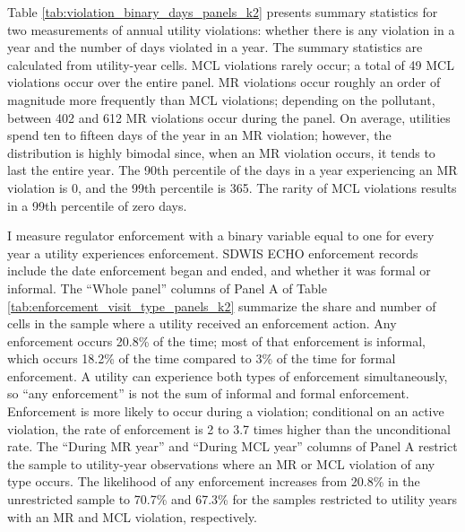 \documentclass[12pt]{article}
\begin{document}
Table \ref{tab:violation_binary_days_panels_k2} presents summary statistics for two measurements of annual utility violations: whether there is any violation in a year and the number of days violated in a year. The summary statistics are calculated from utility-year cells. MCL violations rarely occur; a total of 49 MCL violations occur over the entire panel. MR violations occur roughly an order of magnitude more frequently than MCL violations; depending on the pollutant, between 402 and 612 MR violations occur during the panel. On average, utilities spend ten to fifteen days of the year in an MR violation; however, the distribution is highly bimodal since, when an MR violation occurs, it tends to last the entire year. The 90th percentile of the days in a year experiencing an MR violation is 0, and the 99th percentile is 365. The rarity of MCL violations results in a 99th percentile of zero days.


I measure regulator enforcement with a binary variable equal to one for every year a utility experiences enforcement. SDWIS ECHO enforcement records include the date enforcement began and ended, and whether it was formal or informal. The ``Whole panel'' columns of Panel A of Table \ref{tab:enforcement_visit_type_panels_k2} summarize the share and number of cells in the sample where a utility received an enforcement action. Any enforcement occurs 20.8\% of the time; most of that enforcement is informal, which occurs 18.2\% of the time compared to 3\% of the time for formal enforcement. A utility can experience both types of enforcement simultaneously, so ``any enforcement'' is not the sum of informal and formal enforcement. Enforcement is more likely to occur during a violation; conditional on an active violation, the rate of enforcement is 2 to 3.7 times higher than the unconditional rate. The ``During MR year'' and ``During MCL year'' columns of Panel A restrict the sample to utility-year observations where an MR or MCL violation of any type occurs. The likelihood of any enforcement increases from 20.8\% in the unrestricted sample to 70.7\% and 67.3\% for the samples restricted to utility years with an MR and MCL violation, respectively.  
\end{document}

